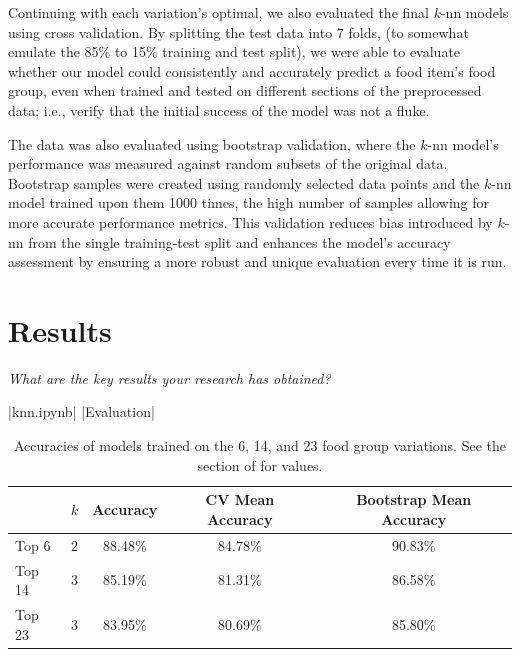 \documentclass[11pt]{article}
\begin{document}
Continuing with each variation's optimal, we also evaluated the final $k$-nn models using cross validation. By splitting the test data into 7 folds, (to somewhat emulate the 85\% to 15\% training and test split), we were able to evaluate whether our model could consistently and accurately predict a food item's food group, even when trained and tested on different sections of the preprocessed data; i.e., verify that the initial success of the model was not a fluke.

The data was also evaluated using bootstrap validation, where the $k$-nn model's performance was measured against random subsets of the original data. Bootstrap samples were created using randomly selected data points and the $k$-nn model trained upon them 1000 times, the high number of samples allowing for more accurate performance metrics. This validation reduces bias introduced by $k$-nn from the single training-test split and enhances the model's accuracy assessment by ensuring a more robust and unique evaluation every time it is run.

\section{Results}
\emph{What are the key results your research has obtained?}

|knn.ipynb|
|Evaluation|
\begin{table}[h]
    \centering
    \begin{tabular}{|l|c|c|c|c|}
        \toprule
        & $k$ & Accuracy & CV Mean Accuracy & Bootstrap Mean Accuracy \\
        \hline
        Top 6     & 2 & 88.48\% & 84.78\% & 90.83\% \\
        Top 14    & 3 & 85.19\% & 81.31\% & 86.58\% \\
        Top 23    & 3 & 83.95\% & 80.69\% & 85.80\% \\
        \bottomrule
    \end{tabular}
    \vspace{0.4cm}
    \caption{Accuracies of models trained on the 6, 14, and 23 food group variations. See the \protect{} section of \protect{} for values.}
    \label{tab:table}
\end{table}
\end{document}
